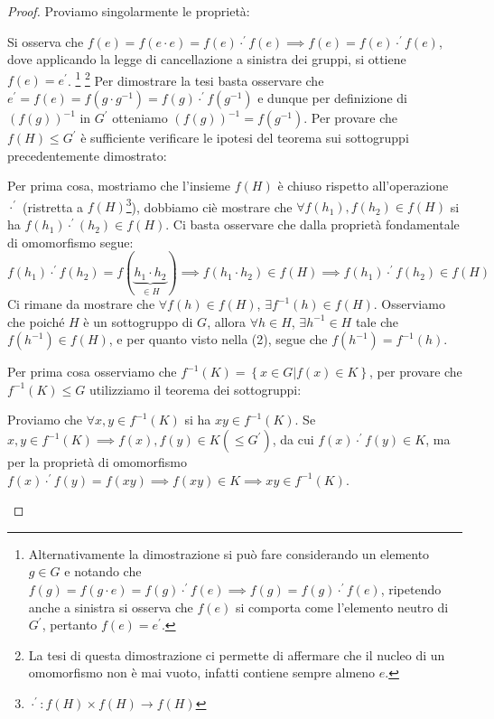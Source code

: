 \documentclass[11pt]{scrartcl}
\begin{document}
\begin{proof}
Proviamo singolarmente le proprietà:
\begin{enumerate}[(1)]
	\ii Si osserva che $f(e)=f(e \cdot e)= f(e) \cdot^{\prime} f(e) \implies f(e)=f(e) \cdot^{\prime} f(e)$, dove applicando la legge di cancellazione a sinistra dei gruppi, si ottiene $f(e)=e^{\prime}$. \footnote{Alternativamente la dimostrazione si può fare considerando un elemento $g\in G$ e notando che $f(g)=f(g \cdot e)=f(g) \cdot^{\prime} f(e) \implies f(g)=f(g) \cdot^{\prime} f(e)$, ripetendo anche a sinistra si osserva che $f(e)$ si comporta come l'elemento neutro di $G^{\prime}$, pertanto $f(e)=e^{\prime}$.} \footnote{La tesi di questa dimostrazione ci permette di affermare che il nucleo di un omomorfismo non è mai vuoto, infatti contiene sempre almeno $e$.}
	\ii Per dimostrare la tesi basta osservare che $e^{\prime}=f(e)=f(g \cdot g^{-1})=f(g) \cdot^{\prime} f(g^{-1})$ e dunque per definizione di $(f(g))^{-1}$ in $G^{\prime}$ otteniamo $(f(g))^{-1}=f(g^{-1})$. 
	\ii Per provare che $f(H) \leqslant G^{\prime}$ è sufficiente verificare le ipotesi del teorema sui sottogruppi precedentemente dimostrato:
		\begin{enumerate}[(a)]
		\ii Per prima cosa, mostriamo che l'insieme $f(H)$ è chiuso rispetto all'operazione $\cdot^{\prime}$ (ristretta a $f(H)$\footnote{$\cdot^{\prime}: f(H) \times f(H) \longrightarrow f(H)$}), dobbiamo ciè mostrare che $\forall f(h_1),f(h_2) \in f(H)$ si ha $ f(h_1) \cdot^{\prime} (h_2) \in f(H)$. Ci basta osservare che dalla proprietà fondamentale di omomorfismo segue:
			\[ f(h_1) \cdot^{\prime} f(h_2)
			=
			f(\underbrace{h_1 \cdot h_2}_{\in H})
			\implies
			f(h_1 \cdot h_2)
			\in f(H)
			\implies
			 f(h_1) \cdot^{\prime} f(h_2)
			 \in f(H)
			\]
		\ii Ci rimane da mostrare che $\forall f(h) \in f(H)$, $\exists f^{-1}(h) \in f(H)$. Osserviamo che poiché $H$ è un sottogruppo di $G$, allora $\forall h \in H$, $\exists h^{-1} \in H$ tale che $f(h^{-1}) \in f(H)$, e per quanto visto nella (2), segue che  $f(h^{-1})=f^{-1}(h)$.
		\end{enumerate}
	\ii Per prima cosa osserviamo che $f^{-1}(K) = \left\{x \in G | f(x) \in K\right\}$, per provare che $f^{-1}(K) \leqslant G$ utilizziamo il teorema dei sottogruppi:
		\begin{enumerate}[(a)]
		\ii Proviamo che $\forall x,y \in f^{-1}(K)$ si ha $xy \in f^{-1}(K)$. Se $x,y \in f^{-1}(K) \implies f(x),f(y) \in K (\leqslant G^{\prime})$, da cui $f(x) \cdot^{\prime} f(y) \in K$, ma per la proprietà di omomorfismo $f(x) \cdot^{\prime} f(y) = f(xy) \implies f(xy) \in K \implies xy \in f^{-1}(K)$.

\end{enumerate}
\end{enumerate}
\end{proof}
\end{document}
